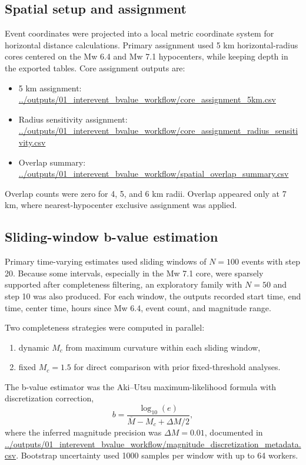 \documentclass[11pt]{article}
\begin{document}
\subsection{Spatial setup and assignment}
Event coordinates were projected into a local metric coordinate system for horizontal distance calculations. Primary assignment used 5 km horizontal-radius cores centered on the Mw 6.4 and Mw 7.1 hypocenters, while keeping depth in the exported tables. Core assignment outputs are:
\begin{itemize}[leftmargin=1.5em]
    \item 5 km assignment: \url{../outputs/01_interevent_bvalue_workflow/core_assignment_5km.csv}
    \item Radius sensitivity assignment: \url{../outputs/01_interevent_bvalue_workflow/core_assignment_radius_sensitivity.csv}
    \item Overlap summary: \url{../outputs/01_interevent_bvalue_workflow/spatial_overlap_summary.csv}
\end{itemize}
Overlap counts were zero for 4, 5, and 6 km radii. Overlap appeared only at 7 km, where nearest-hypocenter exclusive assignment was applied.

\subsection{Sliding-window b-value estimation}
Primary time-varying estimates used sliding windows of $N=100$ events with step 20. Because some intervals, especially in the Mw 7.1 core, were sparsely supported after completeness filtering, an exploratory family with $N=50$ and step 10 was also produced. For each window, the outputs recorded start time, end time, center time, hours since Mw 6.4, event count, and magnitude range.

Two completeness strategies were computed in parallel:
\begin{enumerate}[leftmargin=1.5em]
    \item dynamic $M_c$ from maximum curvature within each sliding window,
    \item fixed $M_c=1.5$ for direct comparison with prior fixed-threshold analyses.
\end{enumerate}
The b-value estimator was the Aki--Utsu maximum-likelihood formula with discretization correction,
\[
 b = \frac{\log_{10}(e)}{\overline{M} - M_c + \Delta M/2},
\]
where the inferred magnitude precision was $\Delta M=0.01$, documented in \url{../outputs/01_interevent_bvalue_workflow/magnitude_discretization_metadata.csv}. Bootstrap uncertainty used 1000 samples per window with up to 64 workers.
\end{document}

